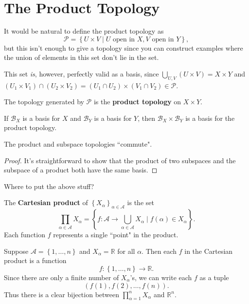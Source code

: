 \documentclass[twoside,10pt]{report}
\begin{document}
\section{The Product Topology}

It would be natural to define the product topology as
\[
	\mathcal{P}= \left\{ U \times V \;|\; U \text{ open in } X, V \text{ open in } Y \right\},
\]but this isn't enough to give a topology since you can construct examples where the union of elements in this set don't lie in the set.

This set \textit{is}, however, perfectly valid as a basis, since $\bigcup_{U,V}(U\times V)=X\times Y$ and $(U_1 \times V_1) \cap (U_2 \times V_2) = (U_1 \cap U_2) \times (V_1 \cap V_2) \in \mathcal{P}$.

\begin{defn}[]
The topology generated by $\mathcal{P}$ is the \textbf{product topology} on $X \times Y$.
\end{defn}

\begin{prop}
If $\mathcal{B}_X$ is a basis for $X$ and $\mathcal{B}_Y$ is a basis for $Y$, then $\mathcal{B}_X \times \mathcal{B}_Y$ is a basis for the product topology.
\end{prop}

\begin{prop}
	The product and subspace topologies ``commute".
\end{prop}
\begin{proof}
	It's straightforward to show that the product of two subspaces and the subspace of a product both have the same basis.
\end{proof}

{\color{red}Where to put the above stuff?}

\begin{defn}[]
The \textbf{Cartesian product} of $\left\{ X_{\alpha} \right\}_{\alpha \in \mathcal{A}}$ is the set
\[
	\prod_{\alpha \in \mathcal{A}}X_{\alpha} = \left\{ f:\mathcal{A}\to \bigcup_{\alpha\in\mathcal{A}}X_{\alpha}\;\Big|\;f(\alpha) \in X_{\alpha} \right\}.
\] Each function $f$ represents a single ``point" in the product.
\end{defn}

\begin{ex}[]
	Suppose $\mathcal{A}=\left\{ 1,\dots,n \right\}$ and $X_{\alpha}=\mathbb{R}$ for all $\alpha$. Then each $f$ in the Cartesian product is a function
	\[
		f:\left\{ 1,\dots,n \right\}\to \mathbb{R}.
	\] Since there are only a finite number of $X_{\alpha}$'s, we can write each $f$ as a tuple
	\[
		(f(1), f(2), \dots, f(n)).
	\] Thus there is a clear bijection between $\prod_{\alpha=1}^n X_{\alpha}$ and $\mathbb{R}^n$.
\end{ex}
\end{document}

